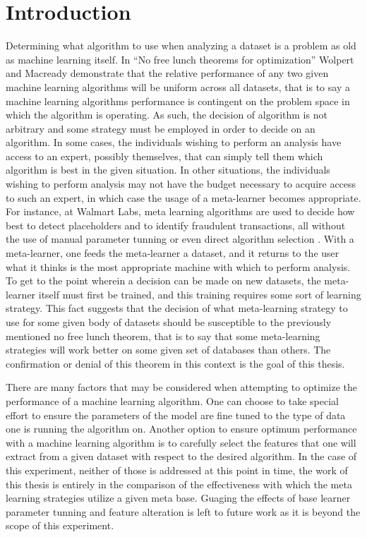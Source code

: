 \chapter{Introduction}
\label{Introduction}
Determining what algorithm to use when analyzing a dataset is a problem as
old as machine learning itself. In ``No free lunch theorems for optimization''
Wolpert and Macready demonstrate that the relative performance of any two given
machine learning algorithms will be uniform across all datasets, that is to say
a machine learning algorithms performance is contingent on the problem space in
which the algorithm is operating. As such, the decision of algorithm is not
arbitrary and some strategy must be employed in order to decide
on an algorithm. In some cases, the individuals wishing to perform an analysis
have access to an expert, possibly themselves, that can simply tell them which
algorithm is best in the given situation. In other situations, the individuals
wishing to perform analysis may not have the budget necessary to acquire access
to such an expert, in which case the usage of a meta-learner becomes appropriate.
For instance, at Walmart Labs, meta learning algorithms are used to decide how
best to detect placeholders and to identify fraudulent transactions, all without
the use of manual parameter tunning or even direct algorithm selection \cite{Gupta}.
With a meta-learner, one feeds the meta-learner a dataset, and it returns to the
user what it thinks is the most appropriate machine with which to perform
analysis. To get to the point wherein a decision can be made on new datasets, the
meta-learner itself must first be trained, and this training requires some
sort of learning strategy. This fact suggests that the decision of what
meta-learning strategy to use for some given body of datasets should be
susceptible to the previously mentioned no free lunch theorem, that is to say
that some meta-learning strategies will work better on some given set of
databases than others. The confirmation or denial of this theorem in this
context is the goal of this thesis.

There are many factors that may be considered when attempting to optimize
the performance of a machine learning algorithm. One can choose to take special
effort to ensure the parameters of the model are fine tuned to the type of data
one is running the algorithm on. Another option to ensure optimum performance
with a machine learning algorithm is to carefully select the features that
one will extract from a given dataset with respect to the desired algorithm.
In the case of this experiment, neither of those is addressed at this point in
time, the work of this thesis is entirely in the comparison of the effectiveness
with which the meta learning strategies utilize a given meta base. Guaging
the effects of base learner parameter tunning and feature alteration is left
to future work as it is beyond the scope of this experiment.

